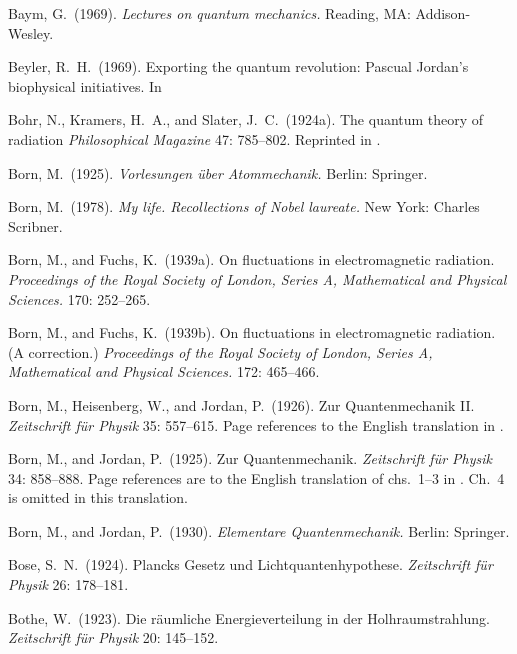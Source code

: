 \documentclass{elsart}
\begin{document}
{\begin{thebibliography}{}
 Baym, G.\ (1969). {\it Lectures on quantum mechanics.} Reading, MA: Addison-Wesley.

 Beyler, R.\ H.\  (1969). Exporting the quantum revolution: Pascual Jordan's biophysical initiatives. In \citep[pp.\ 69--81]{Hoffmann 2007}

 Bohr, N., Kramers, H.\ A., and Slater, J.\ C.\  (1924a). The quantum theory of radiation {\it Philosophical Magazine} 47: 785--802. Reprinted in \citep[pp.\ 159--176]{Van der Waerden}.

 Born, M.\ (1925). {\it Vorlesungen \"{u}ber Atommechanik.} Berlin: Springer.

 Born, M.\ (1978). {\it My life. Recollections of Nobel laureate.} New York: Charles Scribner.

 Born, M., and Fuchs, K.\ (1939a). On fluctuations in electromagnetic radiation. {\it Proceedings of the Royal Society of London, Series A, Mathematical and Physical
Sciences.} 170: 252--265.

 Born, M., and Fuchs, K.\  (1939b). On fluctuations in electromagnetic radiation. (A correction.) {\it Proceedings of the Royal Society of London, Series A, Mathematical and Physical
Sciences.} 172: 465--466.

 Born, M., Heisenberg, W., and Jordan, P.\ (1926). Zur Quantenmechanik II. {\it Zeitschrift f\"{u}r Physik}  35: 557--615. Page references to the English translation in \citep[pp.\ 321--385]{Van der Waerden}.

 Born, M., and Jordan, P.\ (1925). Zur Quantenmechanik. {\it Zeitschrift f\"{u}r Physik} 34: 858--888. Page references are to the English translation of chs.\ 1--3 in \citep[pp.\ 277--306]{Van der Waerden}. Ch.\ 4 is omitted in this translation.

 Born, M., and Jordan, P.\  (1930). {\it Elementare Quantenmechanik.} Berlin: Springer.

 Bose, S.\ N.\ (1924). Plancks Gesetz und Lichtquantenhypothese. {\it Zeitschrift f\"{u}r Physik} 26: 178--181.

 Bothe, W.\ (1923). Die r\"aumliche Energieverteilung in der Holhraumstrahlung. {\it Zeitschrift f\"ur Physik} 20: 145--152.


\end{thebibliography}}
\end{document}
